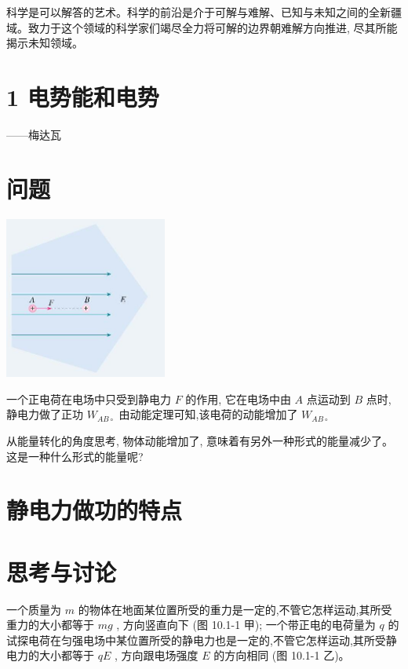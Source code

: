 \documentclass[10pt]{article}
\begin{document}
科学是可以解答的艺术。科学的前沿是介于可解与难解、已知与未知之间的全新疆域。致力于这个领域的科学家们竭尽全力将可解的边界朝难解方向推进, 尽其所能揭示未知领域。

\section*{1 电势能和电势}

——梅达瓦

\section*{问题}

\begin{center}
\includegraphics[max width=0.4\textwidth]{images/01911d5f-8e38-70c0-b5b8-2b399bd115b6_31_656339.jpg}
\end{center}

一个正电荷在电场中只受到静电力 \(F\) 的作用, 它在电场中由 \(A\) 点运动到 \(B\) 点时,静电力做了正功 \({W}_{{AB} \circ }\) 由动能定理可知,该电荷的动能增加了 \({W}_{{AB} \circ }\)

从能量转化的角度思考, 物体动能增加了, 意味着有另外一种形式的能量减少了。这是一种什么形式的能量呢?

\section*{静电力做功的特点}

\section*{思考与讨论}

一个质量为 \(m\) 的物体在地面某位置所受的重力是一定的,不管它怎样运动,其所受重力的大小都等于 \({mg}\) , 方向竖直向下 (图 10.1-1 甲); 一个带正电的电荷量为 \(q\) 的试探电荷在匀强电场中某位置所受的静电力也是一定的,不管它怎样运动,其所受静电力的大小都等于 \({qE}\) , 方向跟电场强度 \(E\) 的方向相同 (图 10.1-1 乙)。
\end{document}
